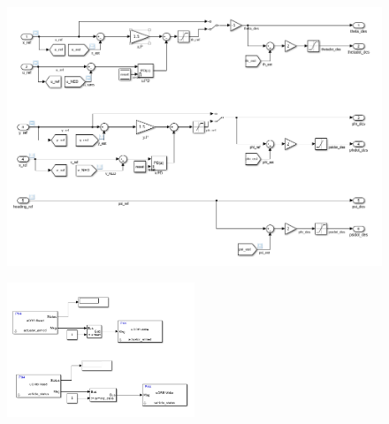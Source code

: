 \begin{figure}
	\centering
	\includegraphics[width=1\textwidth]{SistemaQuadrirotore/Figure/positioncontrollerpid}
\end{figure}

\begin{figure}
	\centering
	\includegraphics[width=0.5\textwidth]{SistemaQuadrirotore/Figure/armpid}
\end{figure}